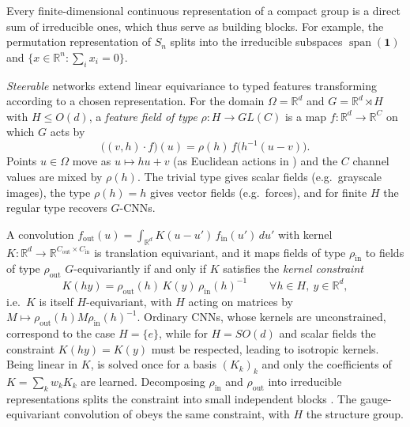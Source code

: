 \documentclass[mathematics,review,submit,moreauthors]{Definitions/mdpi}
\begin{document}
Every finite-dimensional continuous representation of a compact group is a direct sum of irreducible ones, which thus serve as building blocks.
For example, the permutation representation of $S_n$ splits into the irreducible subspaces $\operatorname{span}(\boldsymbol{1})$ and $\{x\in\mathbb{R}^n:\sum_ix_i=0\}$.

\emph{Steerable} networks \citep{cohen2016a,weiler2019anips} extend linear equivariance to typed features transforming according to a chosen representation.
For the domain $\Omega=\mathbb{R}^d$ and $G=\mathbb{R}^d\rtimes H$ with $H\le O(d)$, a \emph{feature field of type} $\rho:H\to GL(C)$ is a map $f:\mathbb{R}^d\to\mathbb{R}^C$ on which $G$ acts by
\begin{equation}\label{eq:feature-field}
    \big((v,h)\cdot f\big)(u)=\rho(h)\,f\big(h^{-1}(u-v)\big).
\end{equation}
Points $u\in\Omega$ move as $u\mapsto hu+v$ (as Euclidean actions in ) and the $C$ channel values are mixed by $\rho(h)$.
The trivial type gives scalar fields (e.g.\ grayscale images), the type $\rho(h)=h$ gives vector fields (e.g.\ forces), and for finite $H$ the regular type recovers $G$-CNNs.

A convolution $f_{\mathrm{out}}(u)=\int_{\mathbb{R}^d}K(u-u')\,f_{\mathrm{in}}(u')\,du'$ with kernel $K:\mathbb{R}^d\to\mathbb{R}^{C_{\mathrm{out}}\times C_{\mathrm{in}}}$ is translation equivariant, and it maps fields of type $\rho_{\mathrm{in}}$ to fields of type $\rho_{\mathrm{out}}$ $G$-equivariantly if and only if $K$ satisfies the \emph{kernel constraint} \citep{weiler2018anips,cesa2021}
\begin{equation}\label{eq:steerable-constraint}
    K(hy)=\rho_{\mathrm{out}}(h)\,K(y)\,\rho_{\mathrm{in}}(h)^{-1}\qquad\forall h\in H,\ y\in\mathbb{R}^d,
\end{equation}
i.e.\ $K$ is itself $H$-equivariant, with $H$ acting on matrices by $M\mapsto\rho_{\mathrm{out}}(h)M\rho_{\mathrm{in}}(h)^{-1}$.
Ordinary CNNs, whose kernels are unconstrained, correspond to the case $H=\{e\}$, while for $H=SO(d)$ and scalar fields the constraint $K(hy)=K(y)$ must be respected, leading to isotropic kernels.
Being linear in $K$,  is solved once for a basis $(K_k)_k$ and only the coefficients of $K=\sum_kw_kK_k$ are learned.
Decomposing $\rho_{\mathrm{in}}$ and $\rho_{\mathrm{out}}$ into irreducible representations splits the constraint into small independent blocks \citep{weiler2019anips,cesa2021}.
The gauge-equivariant convolution of  obeys the same constraint, with $H$ the structure group.
\end{document}
